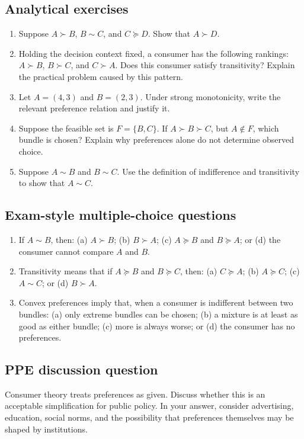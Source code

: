\subsection*{Analytical exercises}
\begin{enumerate}[resume,label=\arabic*.]
  \item Suppose $A\succ B$, $B\sim C$, and $C\succeq D$. Show that $A\succ D$.
  \item Holding the decision context fixed, a consumer has the following rankings: $A\succ B$, $B\succ C$, and $C\succ A$. Does this consumer satisfy transitivity? Explain the practical problem caused by this pattern.
  \item Let $A=(4,3)$ and $B=(2,3)$. Under strong monotonicity, write the relevant preference relation and justify it.
  \item Suppose the feasible set is $F=\{B,C\}$. If $A\succ B\succ C$, but $A\notin F$, which bundle is chosen? Explain why preferences alone do not determine observed choice.
  \item Suppose $A\sim B$ and $B\sim C$. Use the definition of indifference and transitivity to show that $A\sim C$.
\end{enumerate}

\subsection*{Exam-style multiple-choice questions}
\begin{enumerate}[resume,label=\arabic*.]
  \item If $A\sim B$, then: (a) $A\succ B$; (b) $B\succ A$; (c) $A\succeq B$ and $B\succeq A$; or (d) the consumer cannot compare $A$ and $B$.
  \item Transitivity means that if $A\succeq B$ and $B\succeq C$, then: (a) $C\succeq A$; (b) $A\succeq C$; (c) $A\sim C$; or (d) $B\succ A$.
  \item Convex preferences imply that, when a consumer is indifferent between two bundles: (a) only extreme bundles can be chosen; (b) a mixture is at least as good as either bundle; (c) more is always worse; or (d) the consumer has no preferences.
\end{enumerate}

\subsection*{PPE discussion question}

\noindent Consumer theory treats preferences as given. Discuss whether this is an acceptable simplification for public policy. In your answer, consider advertising, education, social norms, and the possibility that preferences themselves may be shaped by institutions.

